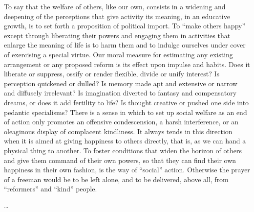 \documentclass[12pt]{article}
\begin{document}
To say that the welfare of others, like our own,
consists in a widening and deepening of the perceptions
that give activity its meaning, in an educative growth,
is to set forth a proposition of political import. To
``make others happy'' except through liberating their
powers and engaging them in activities that enlarge
the meaning of life is to harm them and to indulge
ourselves under cover of exercising a special virtue.
Our moral measure for estimating any existing arrangement
or any proposed reform is its effect upon
impulse and habits. Does it liberate or suppress, ossify
or render flexible, divide or unify interest? Is perception
quickened or dulled? Is memory made apt and
extensive or narrow and diffusely irrelevant? Is imagination
diverted to fantasy and compensatory dreams,
or does it add fertility to life? Is thought creative or
pushed one side into pedantic specialisms? There is a
sense in which to set up social welfare as an end of
action only promotes an offensive condescension, a
harsh interference, or an oleaginous display of complacent
kindliness. It always tends in this direction
when it is aimed at giving happiness to others
directly, that is, as we can hand a physical thing to
another. To foster conditions that widen the horizon
of others and give them command of their own powers,
so that they can find their own happiness in their own
fashion, is the way of ``social'' action. Otherwise the
prayer of a freeman would be to be left alone, and to be
delivered, above all, from ``reformers'' and ``kind''
people.

\bigskip
\centerline{\ldots}
\end{document}
